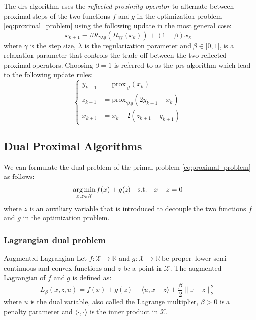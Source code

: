 The \Acrshort{drs} algorithm \cite{Douglas1956OnTN} uses the \textit{reflected proximity operator} to alternate between proximal steps of the two functions $f$ and $g$ in the optimization problem \eqref{eq:proximal_problem} using the following update in the most general case:
\begin{equation}
    x_{k+1} = \beta R_{\gamma \lambda g}(R_{\gamma f}(x_k)) + (1 - \beta) x_k
\end{equation}
where $\gamma$ is the step size, $\lambda$ is the regularization parameter and $\beta \in ]0,1]$, is a relaxation parameter that controls the trade-off between the two reflected proximal operators.
Choosing $\beta = 1$ is referred to as the \acrfull{prs} algorithm which lead to the following update rules:
\begin{equation}
    \begin{cases}
        y_{k+1} &= \text{prox}_{\gamma f}(x_k) \\
        z_{k+1} &= \text{prox}_{\gamma \lambda g}(2 y_{k+1} - x_k) \\
        x_{k+1} &= x_k + 2(z_{k+1} - y_{k+1})
    \end{cases}
\end{equation}

\subsection{Dual Proximal Algorithms}

We can formulate the dual problem of the primal problem \eqref{eq:proximal_problem} as follows:
\begin{equation}
    \mathop{\mathrm{arg\,min}}_{x, z \in \mathcal{X}} f(x) + g(z) \quad \text{s.t.} \quad x - z = 0
    \label{eq:dual_problem}
\end{equation}
where $z$ is an auxiliary variable that is introduced to decouple the two functions $f$ and $g$ in the optimization problem.

\subsubsection{Lagrangian dual problem}


\begin{definition}{Augmented Lagrangian}
    Let $f: \mathcal{X} \to \mathbb{R}$ and $g: \mathcal{X} \to \mathbb{R}$ be proper, lower semi-continuous and convex functions and $z$ be a point in $\mathcal{X}$.
    The augmented Lagrangian of $f$ and $g$ is defined as:
    \begin{equation}
        L_{\beta}(x, z, u) = f(x) + g(z) + \langle u, x - z \rangle + \frac{\beta}{2} \|x - z\|_2^2
    \end{equation}
    where $u$ is the dual variable, also called the Lagrange multiplier, $\beta > 0$ is a penalty parameter and $\langle \cdot, \cdot \rangle$ is the inner product in $\mathcal{X}$.
\end{definition}

